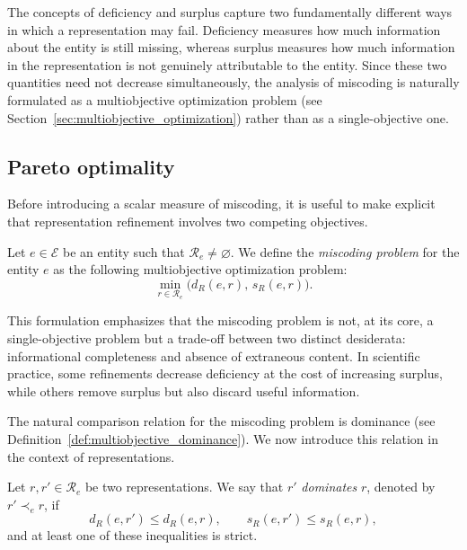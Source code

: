 The concepts of deficiency and surplus capture two fundamentally different ways in which a representation may fail. Deficiency measures how much information about the entity is still missing, whereas surplus measures how much information in the representation is not genuinely attributable to the entity. Since these two quantities need not decrease simultaneously, the analysis of miscoding is naturally formulated as a multiobjective optimization problem (see Section~\ref{sec:multiobjective_optimization}) rather than as a single-objective one.


\subsection*{Pareto optimality}

Before introducing a scalar measure of miscoding, it is useful to make explicit that representation refinement involves two competing objectives.

\begin{definition}
\label{def:miscoding_problem}
Let $e\in\mathcal E$ be an entity such that $\mathcal R_e\neq\varnothing$. We define the \emph{miscoding problem} for the entity $e$ as the following multiobjective optimization problem:
\[
\min_{r\in\mathcal R_e} \bigl(d_R(e,r),\,s_R(e,r)\bigr).
\]
\end{definition}

This formulation emphasizes that the miscoding problem is not, at its core, a single-objective problem but a trade-off between two distinct desiderata: informational completeness and absence of extraneous content. In scientific practice, some refinements decrease deficiency at the cost of increasing surplus, while others remove surplus but also discard useful information.

The natural comparison relation for the miscoding problem is dominance (see Definition~\ref{def:multiobjective_dominance}). We now introduce this relation in the context of representations.

\begin{definition}
\label{def:dominance_miscoding}
Let $r,r'\in\mathcal R_e$ be two representations. We say that $r'$ \emph{dominates} $r$, denoted by $r'\prec_e r$, if
\[
d_R(e,r')\le d_R(e,r), \qquad s_R(e,r')\le s_R(e,r),
\]
and at least one of these inequalities is strict.
\end{definition}

